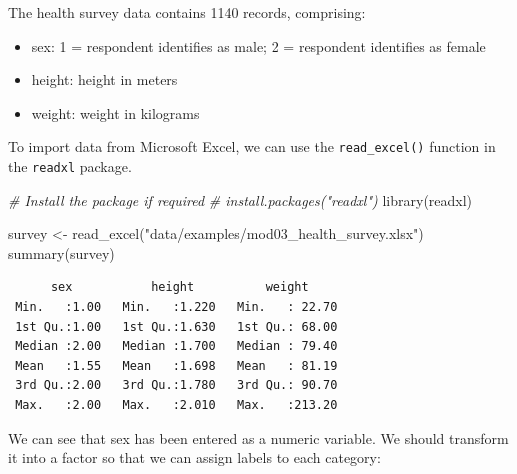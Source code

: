 \documentclass[
  a4paper,
]{memoir}
\newenvironment{Shaded}{\begin{snugshade}}{\end{snugshade}}
\newcommand{\AttributeTok}[1]{\textcolor[rgb]{0.00,0.00,0.00}{#1}}
\newcommand{\CommentTok}[1]{\textcolor[rgb]{0.00,0.00,0.00}{\textit{#1}}}
\newcommand{\DecValTok}[1]{\textcolor[rgb]{0.00,0.00,0.00}{#1}}
\newcommand{\FunctionTok}[1]{\textcolor[rgb]{0.00,0.00,0.00}{#1}}
\newcommand{\NormalTok}[1]{\textcolor[rgb]{0.00,0.00,0.00}{#1}}
\newcommand{\OtherTok}[1]{\textcolor[rgb]{0.00,0.00,0.00}{#1}}
\newcommand{\SpecialCharTok}[1]{\textcolor[rgb]{0.00,0.00,0.00}{#1}}
\newcommand{\StringTok}[1]{\textcolor[rgb]{0.00,0.00,0.00}{#1}}
\providecommand{\tightlist}{%
  \setlength{\itemsep}{0pt}\setlength{\parskip}{0pt}}
\begin{document}
The health survey data contains 1140 records, comprising:

\begin{itemize}
\tightlist
\item
  sex: 1 = respondent identifies as male; 2 = respondent identifies as
  female
\item
  height: height in meters
\item
  weight: weight in kilograms
\end{itemize}

To import data from Microsoft Excel, we can use the
\texttt{read\_excel()} function in the \texttt{readxl} package.

\begin{Shaded}
\begin{Highlighting}[]
\CommentTok{\# Install the package if required}
\CommentTok{\# install.packages("readxl")}
\FunctionTok{library}\NormalTok{(readxl)}

\NormalTok{survey }\OtherTok{\textless{}{-}} \FunctionTok{read\_excel}\NormalTok{(}\StringTok{"data/examples/mod03\_health\_survey.xlsx"}\NormalTok{)}
\FunctionTok{summary}\NormalTok{(survey)}
\end{Highlighting}
\end{Shaded}

\begin{verbatim}
      sex           height          weight      
 Min.   :1.00   Min.   :1.220   Min.   : 22.70  
 1st Qu.:1.00   1st Qu.:1.630   1st Qu.: 68.00  
 Median :2.00   Median :1.700   Median : 79.40  
 Mean   :1.55   Mean   :1.698   Mean   : 81.19  
 3rd Qu.:2.00   3rd Qu.:1.780   3rd Qu.: 90.70  
 Max.   :2.00   Max.   :2.010   Max.   :213.20  
\end{verbatim}

We can see that sex has been entered as a numeric variable. We should
transform it into a factor so that we can assign labels to each
category:

\begin{Shaded}
\end{Shaded}
\end{document}
